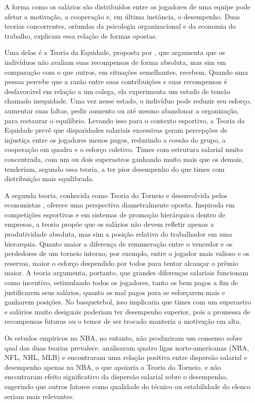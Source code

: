 A forma como os salários são distribuídos entre os jogadores de uma equipe pode afetar a motivação, a cooperação e, em última instância, o desempenho. Duas teorias concorrentes, oriundas da psicologia organizacional e da economia do trabalho, explicam essa relação de formas opostas.

Uma delas é a Teoria da Equidade, proposta por \citet{adams1965}, que argumenta que os indivíduos não avaliam suas recompensas de forma absoluta, mas sim em comparação com o que outros, em situações semelhantes, recebem. Quando uma pessoa percebe que a razão entre suas contribuições e suas recompensas é desfavorável em relação a um colega, ela experimenta um estado de tensão chamado inequidade. Uma vez nesse estado, o indivíduo pode reduzir seu esforço, aumentar suas faltas, pedir aumento ou até mesmo abandonar a organização, para restaurar o equilíbrio. Levando isso para o contexto esportivo, a Teoria da Equidade prevê que disparidades salariais excessivas geram percepções de injustiça entre os jogadores menos pagos, reduzindo a coesão do grupo, a cooperação em quadra e o esforço coletivo. Times com estrutura salarial muito concentrada, com um ou dois superastros ganhando muito mais que os demais, tenderiam, segundo essa teoria, a ter pior desempenho do que times com distribuição mais equilibrada.

A segunda teoria, conhecida como Teoria do Torneio e desenvolvida pelos economistas \citet{lazear1981}, oferece uma perspectiva diametralmente oposta. Inspirada em competições esportivas e em sistemas de promoção hierárquica dentro de empresas, a teoria propõe que os salários não devem refletir apenas a produtividade absoluta, mas sim a posição relativa do trabalhador em uma hierarquia. Quanto maior a diferença de remuneração entre o vencedor e os perdedores de um torneio interno, por exemplo, entre o jogador mais valioso e os reservas, maior o esforço despendido por todos para tentar alcançar o prêmio maior. A teoria argumenta, portanto, que grandes diferenças salariais funcionam como incentivo, estimulando todos os jogadores, tanto os bem pagos a fim de justificarem seus salários, quanto os mal pagos para se esforçarem mais e ganharem posições. No basquetebol, isso implicaria que times com um superastro e salários muito desiguais poderiam ter desempenho superior, pois a promessa de recompensas futuras ou o temor de ser trocado manteria a motivação em alta.

Os estudos empíricos na NBA, no entanto, não produziram um consenso sobre qual das duas teorias prevalece. \citet{frick2003} analisaram quatro ligas norte-americanas (NBA, NFL, NHL, MLB) e encontraram uma relação positiva entre dispersão salarial e desempenho apenas na NBA, o que apoiaria a Teoria do Torneio. \citet{berri2004} e \citet{katayama2011} não encontraram efeito significativo da dispersão salarial sobre o desempenho, sugerindo que outros fatores como qualidade do técnico ou estabilidade do elenco seriam mais relevantes.

